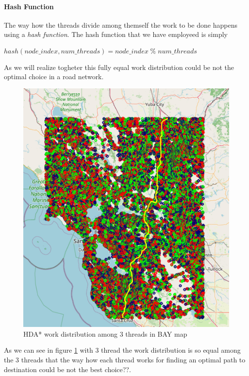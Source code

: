 \documentclass[twocolumn, switch]{article} %
\begin{document}
\paragraph{Hash Function}
The way how the threads divide among themself the work to be done happens using
a \textit{hash function}. The hash function that we have employeed is simply
\begin{center}
  $hash(node\_index, num\_threads) = node\_index \;\%\; num\_threads$
\end{center}
As we will realize togheter this fully equal work distribution could be not the
optimal choice in a road network. 
\begin{figure}[ht!]
  \centering
  \small
  \includegraphics[width=0.5\linewidth]{hda_work_BAY.png}
  \caption{HDA* work distribution among 3 threads in BAY map}
  \label{hdawork}
\end{figure}
As we can see in figure \ref{hdawork} with 3 thread the work distribution is so equal
among the 3 threads that the way how each thread works for finding an optimal path
to destination could be not the best choice??.
\end{document}
